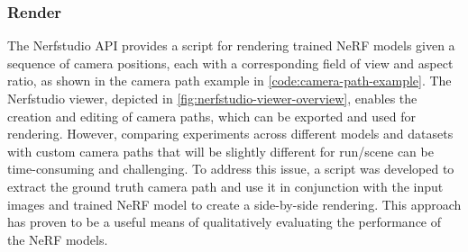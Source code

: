 

\subsubsection{Render} %

The Nerfstudio API provides a script for rendering trained NeRF models given a sequence of camera positions, each with a corresponding field of view and aspect ratio, as shown in the camera path example in \autoref{code:camera-path-example}. The Nerfstudio viewer, depicted in \autoref{fig:nerfstudio-viewer-overview}, enables the creation and editing of camera paths, which can be exported and used for rendering. However, comparing experiments across different models and datasets with custom camera paths that will be slightly different for run/scene can be time-consuming and challenging. To address this issue, a script was developed to extract the ground truth camera path and use it in conjunction with the input images and trained NeRF model to create a side-by-side rendering. This approach has proven to be a useful means of qualitatively evaluating the performance of the NeRF models.






